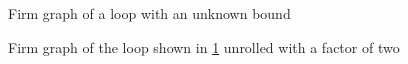 \begin{figure}[h]
    \centering
    \begin{adjustbox}{max width=\textwidth}
        \centering
        
    \end{adjustbox}
    \caption{Firm graph of a loop with an unknown bound}
    \label{fig:impl:unroll:unroll-factor-2-before}
\end{figure}
\begin{figure}[h]
    \centering
    \begin{adjustbox}{max width=\textwidth}
        \centering
        
    \end{adjustbox}
    \caption{Firm graph of the loop shown in \cref{fig:impl:unroll:unroll-factor-2-before} unrolled with a factor of two}
    \label{fig:impl:unroll:unroll-factor-2-after}
\end{figure}